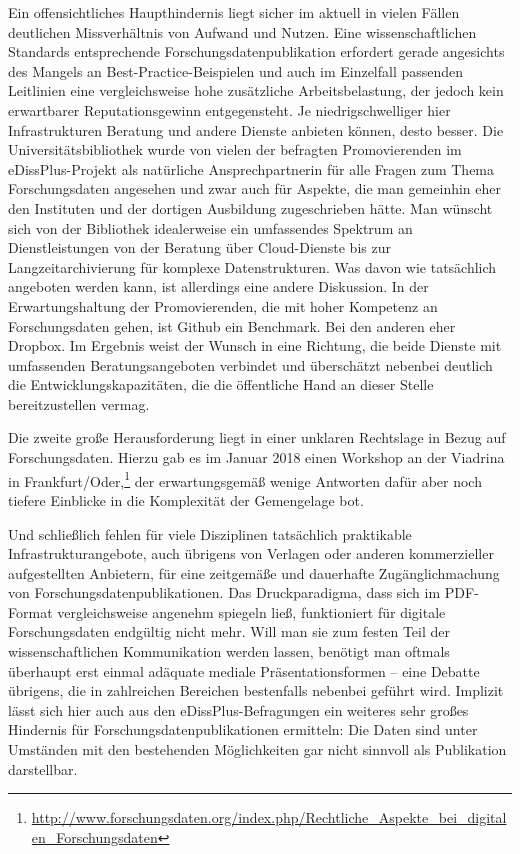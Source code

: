 \documentclass[a4paper,
fontsize=11pt,
oneside,
numbers=noperiodatend,
parskip=half-,
bibliography=totoc,
final
]{scrartcl}
\begin{document}
Ein offensichtliches Haupthindernis liegt sicher im aktuell in vielen
Fällen deutlichen Missverhältnis von Aufwand und Nutzen. Eine
wissenschaftlichen Standards entsprechende Forschungsdatenpublikation
erfordert gerade angesichts des Mangels an Best-Practice-Beispielen und
auch im Einzelfall passenden Leitlinien eine vergleichsweise hohe
zusätzliche Arbeitsbelastung, der jedoch kein erwartbarer
Reputationsgewinn entgegensteht. Je niedrigschwelliger hier
Infrastrukturen Beratung und andere Dienste anbieten können, desto
besser. Die Universitätsbibliothek wurde von vielen der befragten
Promovierenden im eDissPlus-Projekt als natürliche Ansprechpartnerin für
alle Fragen zum Thema Forschungsdaten angesehen und zwar auch für
Aspekte, die man gemeinhin eher den Instituten und der dortigen
Ausbildung zugeschrieben hätte. Man wünscht sich von der Bibliothek
idealerweise ein umfassendes Spektrum an Dienstleistungen von der
Beratung über Cloud-Dienste bis zur Langzeitarchivierung für komplexe
Datenstrukturen. Was davon wie tatsächlich angeboten werden kann, ist
allerdings eine andere Diskussion. In der Erwartungshaltung der
Promovierenden, die mit hoher Kompetenz an Forschungsdaten gehen, ist
Github ein Benchmark. Bei den anderen eher Dropbox. Im Ergebnis weist
der Wunsch in eine Richtung, die beide Dienste mit umfassenden
Beratungsangeboten verbindet und überschätzt nebenbei deutlich die
Entwicklungskapazitäten, die die öffentliche Hand an dieser Stelle
bereitzustellen vermag.

Die zweite große Herausforderung liegt in einer unklaren Rechtslage in
Bezug auf Forschungsdaten. Hierzu gab es im Januar 2018 einen Workshop
an der Viadrina in Frankfurt/Oder,\footnote{\url{http://www.forschungsdaten.org/index.php/Rechtliche_Aspekte_bei_digitalen_Forschungsdaten}}
der erwartungsgemäß wenige Antworten dafür aber noch tiefere Einblicke
in die Komplexität der Gemengelage bot.

Und schließlich fehlen für viele Disziplinen tatsächlich praktikable
Infrastrukturangebote, auch übrigens von Verlagen oder anderen
kommerzieller aufgestellten Anbietern, für eine zeitgemäße und
dauerhafte Zugänglichmachung von Forschungsdatenpublikationen. Das
Druckparadigma, dass sich im PDF-Format vergleichsweise angenehm
spiegeln ließ, funktioniert für digitale Forschungsdaten endgültig nicht
mehr. Will man sie zum festen Teil der wissenschaftlichen Kommunikation
werden lassen, benötigt man oftmals überhaupt erst einmal adäquate
mediale Präsentationsformen -- eine Debatte übrigens, die in zahlreichen
Bereichen bestenfalls nebenbei geführt wird. Implizit lässt sich hier
auch aus den eDissPlus-Befragungen ein weiteres sehr großes Hindernis
für Forschungsdatenpublikationen ermitteln: Die Daten sind unter
Umständen mit den bestehenden Möglichkeiten gar nicht sinnvoll als
Publikation darstellbar.
\end{document}
